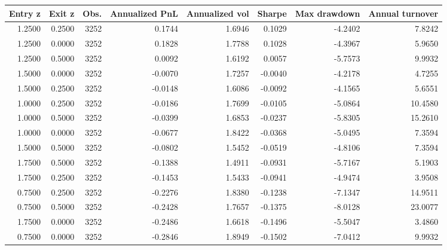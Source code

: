 \begin{tabular}{rrrrrrrr}
\toprule
Entry z & Exit z & Obs. & Annualized PnL & Annualized vol & Sharpe & Max drawdown & Annual turnover \\
\midrule
1.2500 & 0.2500 & 3252 & 0.1744 & 1.6946 & 0.1029 & -4.2402 & 7.8242 \\
1.2500 & 0.0000 & 3252 & 0.1828 & 1.7788 & 0.1028 & -4.3967 & 5.9650 \\
1.2500 & 0.5000 & 3252 & 0.0092 & 1.6192 & 0.0057 & -5.7573 & 9.9932 \\
1.5000 & 0.0000 & 3252 & -0.0070 & 1.7257 & -0.0040 & -4.2178 & 4.7255 \\
1.5000 & 0.2500 & 3252 & -0.0148 & 1.6086 & -0.0092 & -4.1565 & 5.6551 \\
1.0000 & 0.2500 & 3252 & -0.0186 & 1.7699 & -0.0105 & -5.0864 & 10.4580 \\
1.0000 & 0.5000 & 3252 & -0.0399 & 1.6853 & -0.0237 & -5.8305 & 15.2610 \\
1.0000 & 0.0000 & 3252 & -0.0677 & 1.8422 & -0.0368 & -5.0495 & 7.3594 \\
1.5000 & 0.5000 & 3252 & -0.0802 & 1.5452 & -0.0519 & -4.8106 & 7.3594 \\
1.7500 & 0.5000 & 3252 & -0.1388 & 1.4911 & -0.0931 & -5.7167 & 5.1903 \\
1.7500 & 0.2500 & 3252 & -0.1453 & 1.5433 & -0.0941 & -4.9474 & 3.9508 \\
0.7500 & 0.2500 & 3252 & -0.2276 & 1.8380 & -0.1238 & -7.1347 & 14.9511 \\
0.7500 & 0.5000 & 3252 & -0.2428 & 1.7657 & -0.1375 & -8.0128 & 23.0077 \\
1.7500 & 0.0000 & 3252 & -0.2486 & 1.6618 & -0.1496 & -5.5047 & 3.4860 \\
0.7500 & 0.0000 & 3252 & -0.2846 & 1.8949 & -0.1502 & -7.0412 & 9.9932 \\
\bottomrule
\end{tabular}
